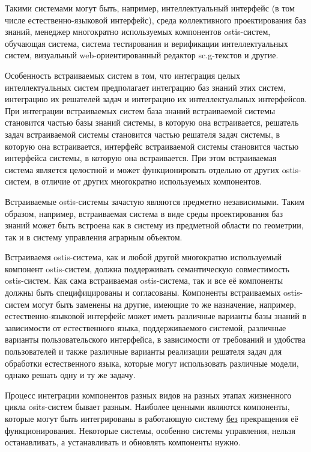 Такими системами могут быть, например, интеллектуальный интерфейс (в том числе естественно-языковой интерфейс), среда коллективного проектирования баз знаний, менеджер многократно используемых компонентов ostis-систем, обучающая система, система тестирования и верификации интеллектуальных систем, визуальный web-ориентированный редактор sc.g-текстов и другие.

Особенность встраиваемых систем в том, что интеграция целых интеллектуальных систем предполагает интеграцию баз знаний этих систем, интеграцию их решателей задач и интеграцию их интеллектуальных интерфейсов. При интеграции встраиваемых систем база знаний встраиваемой системы становится частью базы знаний системы, в которую она встраивается, решатель задач встраиваемой системы становится частью решателя задач системы, в которую она встраивается, интерфейс встраиваемой системы становится частью интерфейса системы, в которую она встраивается. При этом встраиваемая система является целостной и может функционировать отдельно от других ostis-систем, в отличие от других многократно используемых компонентов.

Встраиваемые ostis-системы зачастую являются предметно независимыми. Таким образом, например, встраиваемая система в виде среды проектирования баз знаний может быть встроена как в систему из предметной области по геометрии, так и в систему управления аграрным объектом.

Встраиваемя ostis-система, как и любой другой многократно используемый компонент ostis-систем, должна поддерживать семантическую совместимость ostis-систем. Как сама встраиваемая ostis-система, так и все её компоненты должны быть специфицированы и согласованы. Компоненты встраиваемых ostis-систем могут быть заменены на другие, имеющие то же назначение, например, естественно-языковой интерфейс может иметь различные варианты базы знаний в зависимости от естественного языка, поддерживаемого системой, различные варианты пользовательского интерфейса, в зависимости от требований и удобства пользователей и также различные варианты реализации решателя задач для обработки естественного языка, которые могут использовать различные модели, однако решать одну и ту же задачу.

Процесс интеграции компонентов разных видов на разных этапах жизненного цикла osits-систем бывает разным. Наиболее ценными являются компоненты, которые могут быть интегрированы в работающую систему \underline{без} прекращения её функционирования. Некоторые системы, особенно системы управления, нельзя останавливать, а устанавливать и обновлять компоненты нужно.

